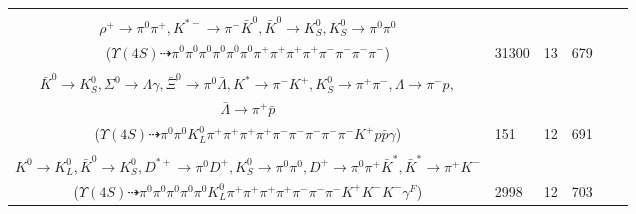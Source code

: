 \documentclass[landscape]{article}
\newcounter{rownumbers}
\newcommand\rn{\stepcounter{rownumbers}\arabic{rownumbers}}
\newcommand{\EOLP}{\\ \hline} %
\newcommand{\topoTags}[1]{#1} %
\begin{document}
\begin{longtable}{clcccc}
\rn & \makecell[l]{ $ 
\Upsilon(4S) \rightarrow \bar{B}^{0} \bar{B}^{0} ,
\bar{B}^{0} \rightarrow \pi^{0} \pi^{+} \pi^{-} ,
\bar{B}^{0} \rightarrow \pi^{0} \pi^{-} \omega D^{*+} ,
\omega \rightarrow \pi^{0} \pi^{+} \pi^{-} ,
D^{*+} \rightarrow \pi^{+} D^{0} ,
D^{0} \rightarrow \rho^{+} K^{*-} ,
$ \\ $
\rho^{+} \rightarrow \pi^{0} \pi^{+} ,
K^{*-} \rightarrow \pi^{-} \bar{K}^{0} ,
\bar{K}^{0} \rightarrow K_{S}^{0} ,
K_{S}^{0} \rightarrow \pi^{0} \pi^{0} 
$ \\ ($
\Upsilon(4S) \dashrightarrow \pi^{0} \pi^{0} \pi^{0} \pi^{0} \pi^{0} \pi^{0} \pi^{+} \pi^{+} \pi^{+} \pi^{+} \pi^{-} \pi^{-} \pi^{-} \pi^{-} 
$) } & \topoTags{31300 & }13 & 679 \EOLP

\rn & \makecell[l]{ $ 
\Upsilon(4S) \rightarrow B^{0} \bar{B}^{0} ,
B^{0} \rightarrow \pi^{-} K_1^{\prime+} ,
\bar{B}^{0} \rightarrow \omega \bar{K}^{0} \bar{K}^{0} \Sigma^{0} \bar{\Xi}^{0} ,
K_1^{\prime+} \rightarrow \pi^{+} K^{*} ,
\omega \rightarrow \pi^{0} \pi^{+} \pi^{-} ,
\bar{K}^{0} \rightarrow K_{L}^{0} ,
$ \\ $
\bar{K}^{0} \rightarrow K_{S}^{0} ,
\Sigma^{0} \rightarrow \Lambda \gamma ,
\bar{\Xi}^{0} \rightarrow \pi^{0} \bar{\Lambda} ,
K^{*} \rightarrow \pi^{-} K^{+} ,
K_{S}^{0} \rightarrow \pi^{+} \pi^{-} ,
\Lambda \rightarrow \pi^{-} p ,
$ \\ $
\bar{\Lambda} \rightarrow \pi^{+} \bar{p} 
$ \\ ($
\Upsilon(4S) \dashrightarrow \pi^{0} \pi^{0} K_{L}^{0} \pi^{+} \pi^{+} \pi^{+} \pi^{+} \pi^{-} \pi^{-} \pi^{-} \pi^{-} \pi^{-} K^{+} p \bar{p} \gamma 
$) } & \topoTags{151 & }12 & 691 \EOLP

\rn & \makecell[l]{ $ 
\Upsilon(4S) \rightarrow B^{0} \bar{B}^{0} ,
B^{0} \rightarrow K^{-} K^{*}(1680)^{+} ,
\bar{B}^{0} \rightarrow \rho^{0} \pi^{-} \eta K^{0} \bar{K}^{0} D^{*+} ,
K^{*}(1680)^{+} \rightarrow \pi^{0} K^{+} ,
\rho^{0} \rightarrow \pi^{+} \pi^{-} ,
\eta \rightarrow \pi^{+} \pi^{-} \gamma^{F} ,
$ \\ $
K^{0} \rightarrow K_{L}^{0} ,
\bar{K}^{0} \rightarrow K_{S}^{0} ,
D^{*+} \rightarrow \pi^{0} D^{+} ,
K_{S}^{0} \rightarrow \pi^{0} \pi^{0} ,
D^{+} \rightarrow \pi^{0} \pi^{+} \bar{K}^{*} ,
\bar{K}^{*} \rightarrow \pi^{+} K^{-} 
$ \\ ($
\Upsilon(4S) \dashrightarrow \pi^{0} \pi^{0} \pi^{0} \pi^{0} \pi^{0} K_{L}^{0} \pi^{+} \pi^{+} \pi^{+} \pi^{+} \pi^{-} \pi^{-} \pi^{-} K^{+} K^{-} K^{-} \gamma^{F} 
$) } & \topoTags{2998 & }12 & 703 \EOLP


\end{longtable}
\end{document}

